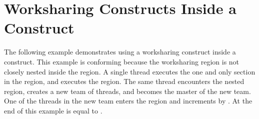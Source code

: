 \pagebreak
\section{Worksharing Constructs Inside a  Construct}
\label{sec:worksharing_critical}

The following example demonstrates using a worksharing construct inside a  
construct. This example is conforming because the worksharing   
region is not closely nested inside the  region. A single thread 
executes the one and only section in the  region, and executes 
the  region. The same thread encounters the nested  
region, creates a new team of threads, and becomes the master of the new team. 
One of the threads in the new team enters the  region and increments 
 by . At the end of this example  is equal to .




